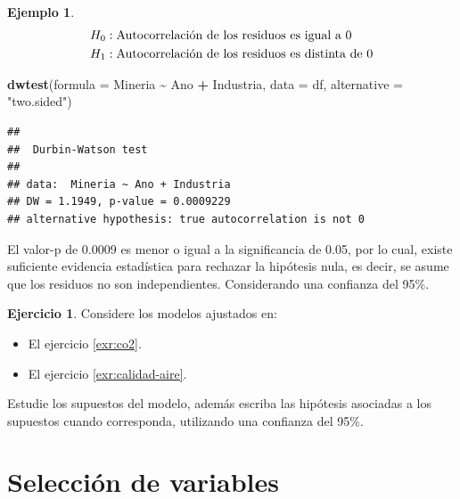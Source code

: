 \documentclass[
  11pt,
]{book}
\newenvironment{Shaded}{\begin{snugshade}}{\end{snugshade}}
\newcommand{\AttributeTok}[1]{\textcolor[rgb]{0.13,0.29,0.53}{#1}}
\newcommand{\FunctionTok}[1]{\textcolor[rgb]{0.13,0.29,0.53}{\textbf{#1}}}
\newcommand{\NormalTok}[1]{#1}
\newcommand{\SpecialCharTok}[1]{\textcolor[rgb]{0.81,0.36,0.00}{\textbf{#1}}}
\newcommand{\StringTok}[1]{\textcolor[rgb]{0.31,0.60,0.02}{#1}}
\providecommand{\tightlist}{%
  \setlength{\itemsep}{0pt}\setlength{\parskip}{0pt}}
\theoremstyle{definition}
\theoremstyle{definition}
\newtheorem{example}{Ejemplo}[chapter]
\theoremstyle{definition}
\newtheorem{exercise}{Ejercicio}[chapter]
\theoremstyle{definition}
\theoremstyle{remark}
\begin{document}
\begin{example}
\begin{equation}
\notag
\begin{split}
H_0&: \text{Autocorrelación de los residuos es igual a 0}\\
H_1&: \text{Autocorrelación de los residuos es distinta de 0}\\
\end{split}
\end{equation}

\begin{Shaded}
\begin{Highlighting}[]
\FunctionTok{dwtest}\NormalTok{(}\AttributeTok{formula =}\NormalTok{ Mineria }\SpecialCharTok{\textasciitilde{}}\NormalTok{ Ano }\SpecialCharTok{+}\NormalTok{ Industria, }\AttributeTok{data =}\NormalTok{ df, }\AttributeTok{alternative =} \StringTok{"two.sided"}\NormalTok{)}
\end{Highlighting}
\end{Shaded}

\begin{verbatim}
## 
##  Durbin-Watson test
## 
## data:  Mineria ~ Ano + Industria
## DW = 1.1949, p-value = 0.0009229
## alternative hypothesis: true autocorrelation is not 0
\end{verbatim}

El valor-p de 0.0009 es menor o igual a la significancia de 0.05, por lo cual, existe suficiente evidencia estadística para rechazar la hipótesis nula, es decir, se asume que los residuos no son independientes. Considerando una confianza del 95\%.
\end{example}

\begin{exercise}
Considere los modelos ajustados en:

\begin{itemize}
\tightlist
\item
  El ejercicio \ref{exr:co2}.
\item
  El ejercicio \ref{exr:calidad-aire}.
\end{itemize}

Estudie los supuestos del modelo, además escriba las hipótesis asociadas a los supuestos cuando corresponda, utilizando una confianza del 95\%.
\end{exercise}

\section{Selección de variables}\label{selecciuxf3n-de-variables}
\end{document}
